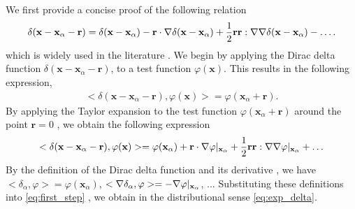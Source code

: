 We first provide a concise proof of the following relation
\begin{equation}
    \delta(\textbf{x} - \textbf{x}_\alpha - \textbf{r})
    = \delta(\textbf{x} - \textbf{x}_\alpha)
    - \textbf{r}\cdot\grad \delta(\textbf{x} - \textbf{x}_\alpha)
    + \frac{1}{2}\textbf{rr}:\grad\grad\delta(\textbf{x} - \textbf{x}_\alpha) 
    - \ldots.
    \label{eq:exp_delta}
    \end{equation}
 which is widely used in the literature \citep{zhang2023evolution}. 
We begin by applying the Dirac delta function $\delta(\textbf{x} - \textbf{x}_\alpha - \textbf{r})$, to a test function $\varphi(\textbf{x})$.
This results in the following expression,
\begin{align*}
    < \delta(\textbf{x} - \textbf{x}_\alpha - \textbf{r}), \varphi(\textbf{x})> 
    =
    \varphi(\textbf{x}_\alpha + \textbf{r}).  
\end{align*}
By applying the Taylor expansion to the test function $\varphi(\textbf{x}_\alpha + \textbf{r})$ around the point $\textbf{r} = 0$ , we obtain the following expression
\begin{equation}
    < \delta(\textbf{x} - \textbf{x}_\alpha - \textbf{r}), \varphi(\textbf{x})> 
    =
    \varphi(\textbf{x}_\alpha) 
    + \textbf{r} \cdot \grad \varphi|_{\textbf{x}_\alpha}
    + \frac{1}{2}\textbf{r}\textbf{r} : \grad\grad \varphi|_{\textbf{x}_\alpha}
    + \ldots
    \label{eq:first_step}
\end{equation}
By the definition of the Dirac delta function and its derivative \citep{appel2007}, we have  %
$  <\delta_\alpha, \varphi> = \varphi(\textbf{x}_\alpha)$, %
$<\mathbf{\nabla}\delta_\alpha, \varphi> = -\mathbf{\nabla}\varphi|_{\textbf{x}_\alpha} $,
$...$  
Substituting these definitions into \ref{eq:first_step} , we obtain in the distributional sense \ref{eq:exp_delta}. 

